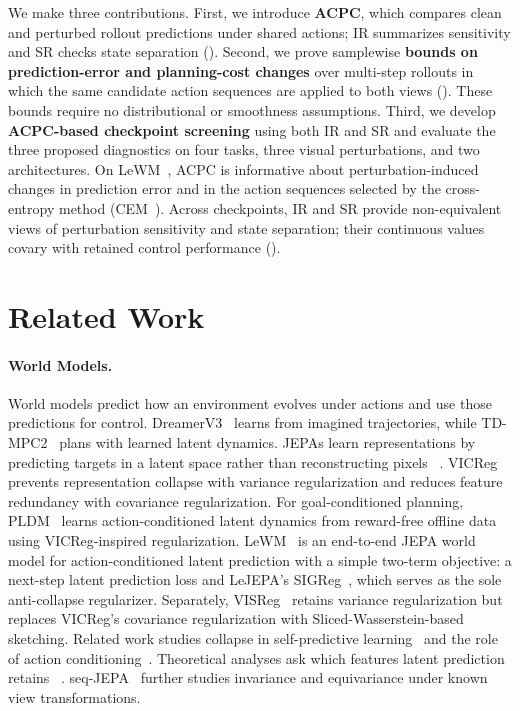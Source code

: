 \documentclass{article}
\begin{document}
We make three contributions. First, we introduce \textbf{ACPC}, which compares
clean and perturbed rollout predictions under shared actions; IR summarizes
sensitivity and SR checks state separation (). Second, we
prove samplewise \textbf{bounds on prediction-error and planning-cost changes}
over multi-step rollouts in which the same candidate action sequences are applied to both views
(). These bounds
require no distributional or smoothness assumptions. Third, we develop
\textbf{ACPC-based checkpoint screening} using both IR and SR and evaluate the three proposed diagnostics on four tasks, three visual perturbations, and two architectures.
On LeWM~\citep{maes2026lewm}, ACPC is informative about perturbation-induced changes in prediction error and in the action sequences selected by the cross-entropy method (CEM~\citep{kroese2006cem}). Across
checkpoints, IR and SR provide non-equivalent views of perturbation sensitivity
and state separation; their continuous values covary with retained
control performance ().

\section{Related Work}\label{sec:related}

\paragraph{World Models.}
World models predict how an environment evolves under actions and use those
predictions for control. DreamerV3~\citep{hafner2025dreamerv3} learns from
imagined trajectories, while TD-MPC2~\citep{hansen2024tdmpc2} plans with
learned latent dynamics. JEPAs
learn representations by predicting targets in a latent space rather
than reconstructing pixels
~\citep{lecun2022path,assran2023ijepa,bardes2024vjepa,assran2025vjepa2}.
VICReg~\citep{bardes2022vicreg} prevents representation collapse with variance regularization
and reduces feature redundancy with covariance regularization.
For goal-conditioned planning, PLDM~\citep{sobal2025stresstesting} learns
action-conditioned latent dynamics from reward-free offline data using
VICReg-inspired regularization.
LeWM~\citep{maes2026lewm} is an end-to-end JEPA world model for
action-conditioned latent prediction with a simple two-term objective: a
next-step latent prediction loss and LeJEPA's SIGReg~\citep{balestriero2025lejepa}, which serves as the sole anti-collapse regularizer.
Separately, VISReg~\citep{wu2026visreg} retains variance regularization but
replaces VICReg's covariance regularization with Sliced-Wasserstein-based
sketching.
Related work studies collapse in self-predictive
learning~\citep{tang2023selfpredictive} and the role of action
conditioning~\citep{khetarpal2025actionconditional}.
Theoretical analyses ask which features latent prediction retains
~\citep{vanassel2025jointembeddingreconstruction,littwin2024jepaavoidsnoisyfeatures}.
seq-JEPA~\citep{ghaemi2025seqjepa} further studies invariance and equivariance
under known view transformations.
\end{document}
